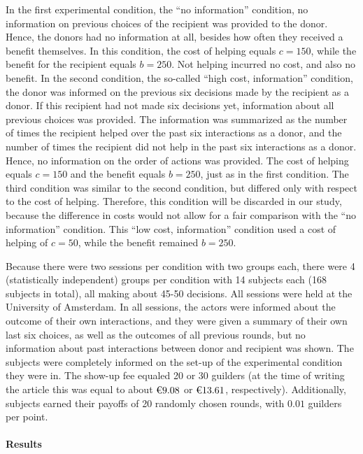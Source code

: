 \documentclass[
  11pt,
]{article}
\begin{document}
In the first experimental condition, the ``no information'' condition, no information on previous choices of the recipient was provided to the donor. Hence, the donors had no information at all, besides how often they received a benefit themselves. In this condition, the cost of helping equals \(c = 150\), while the benefit for the recipient equals \(b = 250\). Not helping incurred no cost, and also no benefit. In the second condition, the so-called ``high cost, information'' condition, the donor was informed on the previous six decisions made by the recipient as a donor. If this recipient had not made six decisions yet, information about all previous choices was provided. The information was summarized as the number of times the recipient helped over the past six interactions as a donor, and the number of times the recipient did not help in the past six interactions as a donor. Hence, no information on the order of actions was provided. The cost of helping equals \(c = 150\) and the benefit equals \(b = 250\), just as in the first condition. The third condition was similar to the second condition, but differed only with respect to the cost of helping. Therefore, this condition will be discarded in our study, because the difference in costs would not allow for a fair comparison with the ``no information'' condition. This ``low cost, information'' condition used a cost of helping of \(c = 50\), while the benefit remained \(b = 250\).

Because there were two sessions per condition with two groups each, there were 4 (statistically independent) groups per condition with 14 subjects each (168 subjects in total), all making about 45-50 decisions. All sessions were held at the University of Amsterdam. In all sessions, the actors were informed about the outcome of their own interactions, and they were given a summary of their own last six choices, as well as the outcomes of all previous rounds, but no information about past interactions between donor and recipient was shown. The subjects were completely informed on the set-up of the experimental condition they were in. The show-up fee equaled 20 or 30 guilders (at the time of writing the article this was equal to about \(\text{\texteuro}9.08\) or \(\text{\texteuro}13.61\), respectively). Additionally, subjects earned their payoffs of 20 randomly chosen rounds, with \(0.01\) guilders per point.

\hypertarget{results-3}{%
\paragraph{Results}\label{results-3}}
\end{document}

